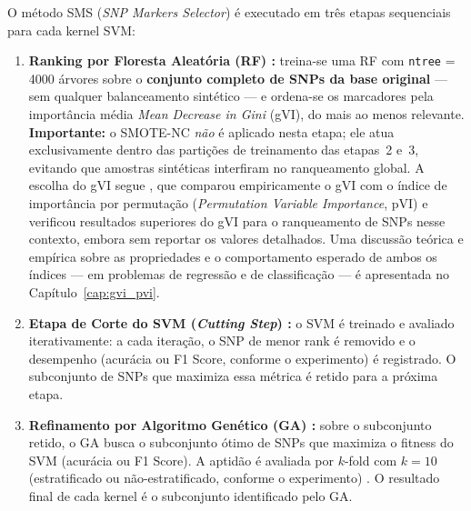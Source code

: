 \documentclass[
    12pt,
    a4paper,
    oneside,
    english,
    french,
    spanish,
    brazil
    ]{abntex2}
\newcommand{\novo}[1]{\textcolor{corNova}{#1}}
\begin{document}
\novo{O método SMS (\textit{SNP Markers Selector}) \cite{de2014snps,Oliveira2015,Souza2022,Baptista2024} é executado em três etapas sequenciais para cada kernel SVM:}
\begin{enumerate}
  \item \novo{\textbf{Ranking por Floresta Aleatória (RF) \cite{breiman2001random,RF,goldstein2011random}:} treina-se uma RF com \texttt{ntree} = 4000 árvores sobre o \textbf{conjunto completo de SNPs da base original} --- sem qualquer balanceamento sintético --- e ordena-se os marcadores pela importância média \textit{Mean Decrease in Gini} (gVI), do mais ao menos relevante. \textbf{Importante:} o SMOTE-NC \emph{não} é aplicado nesta etapa; ele atua exclusivamente dentro das partições de treinamento das etapas~2 e~3, evitando que amostras sintéticas interfiram no ranqueamento global. A escolha do gVI segue \citeonline{Oliveira2015}, que comparou empiricamente o gVI com o índice de importância por permutação (\textit{Permutation Variable Importance}, pVI) e verificou resultados superiores do gVI para o ranqueamento de SNPs nesse contexto, embora sem reportar os valores detalhados. Uma discussão teórica e empírica sobre as propriedades e o comportamento esperado de ambos os índices --- em problemas de regressão e de classificação --- é apresentada no Capítulo~\ref{cap:gvi_pvi}.}
  \item \novo{\textbf{Etapa de Corte do SVM (\textit{Cutting Step}) \cite{vapnik95,chang2011libsvm,e1071}:} o SVM é treinado e avaliado iterativamente: a cada iteração, o SNP de menor rank é removido e o desempenho (acurácia ou F1 Score, conforme o experimento) é registrado. O subconjunto de SNPs que maximiza essa métrica é retido para a próxima etapa.}
  \item \novo{\textbf{Refinamento por Algoritmo Genético (GA) \cite{Goldberg1989,scrucca2012ga}:} sobre o subconjunto retido, o GA busca o subconjunto ótimo de SNPs que maximiza o fitness do SVM (acurácia ou F1 Score). A aptidão é avaliada por $k$-fold com $k=10$ (estratificado ou não-estratificado, conforme o experimento) \cite{Kohavi1995}. O resultado final de cada kernel é o subconjunto identificado pelo GA.}
\end{enumerate}
\end{document}
